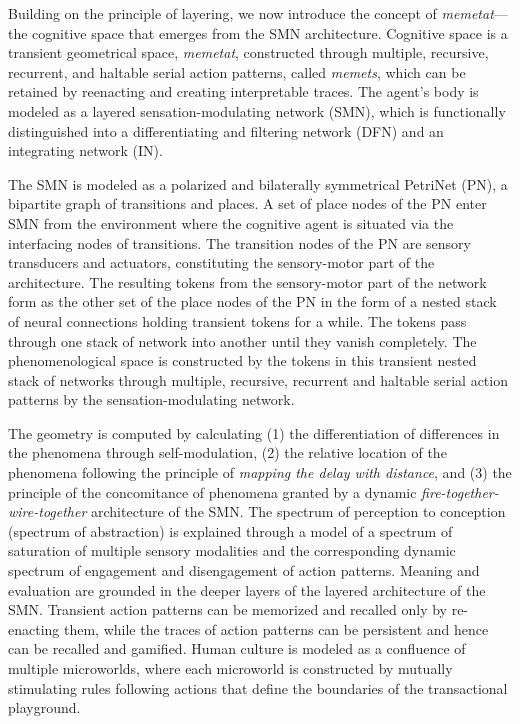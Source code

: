 Building on the principle of layering, we now introduce the concept of \textit{memetat}—the cognitive space that emerges from the SMN architecture. Cognitive space is a transient geometrical space, \textit{memetat}, constructed through multiple, recursive, recurrent, and haltable serial action patterns, called \textit{memets}, which can be retained by reenacting and creating interpretable traces. The agent's body is modeled as a layered sensation-modulating network (SMN), which is functionally distinguished into a differentiating and filtering network (DFN) and an integrating network (IN).

The SMN is modeled as a polarized and bilaterally symmetrical PetriNet (PN), a bipartite graph of transitions and places. A set of place nodes of the PN enter SMN from the environment where the cognitive agent is situated via the interfacing nodes of transitions. The transition nodes of the PN are sensory transducers and actuators, constituting the sensory-motor part of the architecture. The resulting tokens from the sensory-motor part of the network form as the other set of the place nodes of the PN in the form of a nested stack of neural connections holding transient tokens for a while. The tokens pass through one stack of network into another until they vanish completely. The phenomenological space is constructed by the tokens in this transient nested stack of networks through multiple, recursive, recurrent and haltable serial action patterns by the sensation-modulating network.

The geometry is computed by calculating (1) the differentiation of differences in the phenomena through self-modulation, (2) the relative location of the phenomena following the principle of \textit{mapping the delay with distance}, and (3) the principle of the concomitance of phenomena granted by a dynamic \textit{fire-together-wire-together} architecture of the SMN. The spectrum of perception to conception (spectrum of abstraction) is explained through a model of a spectrum of saturation of multiple sensory modalities and the corresponding dynamic spectrum of engagement and disengagement of action patterns. Meaning and evaluation are grounded in the deeper layers of the layered architecture of the SMN. Transient action patterns can be memorized and recalled only by re-enacting them, while the traces of action patterns can be persistent and hence can be recalled and gamified. Human culture is modeled as a confluence of multiple microworlds, where each microworld is constructed by mutually stimulating rules following actions that define the boundaries of the transactional playground.

